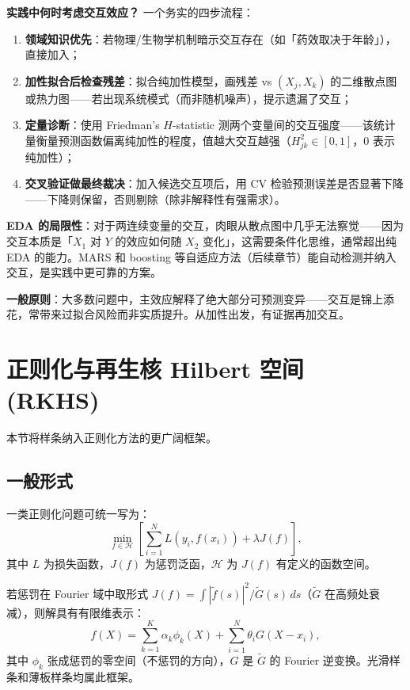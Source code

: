 \textbf{实践中何时考虑交互效应？} 一个务实的四步流程：

\begin{enumerate}
    \item \textbf{领域知识优先}：若物理/生物学机制暗示交互存在（如「药效取决于年龄」），直接加入；
    \item \textbf{加性拟合后检查残差}：拟合纯加性模型，画残差 vs $(X_j, X_k)$ 的二维散点图或热力图——若出现系统模式（而非随机噪声），提示遗漏了交互；
    \item \textbf{定量诊断}：使用 Friedman's $H$-statistic 测两个变量间的交互强度——该统计量衡量预测函数偏离纯加性的程度，值越大交互越强（$H^2_{jk} \in [0,1]$，0 表示纯加性）；
    \item \textbf{交叉验证做最终裁决}：加入候选交互项后，用 CV 检验预测误差是否显著下降——下降则保留，否则剔除（除非解释性有强需求）。
\end{enumerate}

\textbf{EDA 的局限性}：对于两连续变量的交互，肉眼从散点图中几乎无法察觉——因为交互本质是「$X_1$ 对 $Y$ 的效应如何随 $X_2$ 变化」，这需要条件化思维，通常超出纯 EDA 的能力。MARS 和 boosting 等自适应方法（后续章节）能自动检测并纳入交互，是实践中更可靠的方案。

\textbf{一般原则}：大多数问题中，主效应解释了绝大部分可预测变异——交互是锦上添花，常带来过拟合风险而非实质提升。从加性出发，有证据再加交互。


\section{正则化与再生核 Hilbert 空间 (RKHS)}

本节将样条纳入正则化方法的更广阔框架。

\subsection{一般形式}

一类正则化问题可统一写为：
\begin{equation}\label{eq:general_regularization}
    \min_{f \in \mathcal{H}} \left[ \sum_{i=1}^{N} L(y_i, f(x_i)) + \lambda J(f) \right],
\end{equation}
其中 $L$ 为损失函数，$J(f)$ 为惩罚泛函，$\mathcal{H}$ 为 $J(f)$ 有定义的函数空间。

若惩罚在 Fourier 域中取形式 $J(f) = \int |\tilde{f}(s)|^2 / \tilde{G}(s)\,ds$（$\tilde{G}$ 在高频处衰减），则解具有有限维表示：
\[
f(X) = \sum_{k=1}^{K} \alpha_k \phi_k(X) + \sum_{i=1}^{N} \theta_i G(X - x_i),
\]
其中 $\phi_k$ 张成惩罚的零空间（不惩罚的方向），$G$ 是 $\tilde{G}$ 的 Fourier 逆变换。光滑样条和薄板样条均属此框架。

